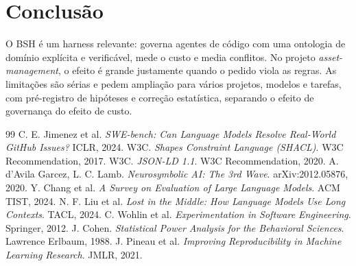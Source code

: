 \documentclass[11pt,a4paper]{article}
\begin{document}
\section{Conclusão}
O BSH é um harness relevante: governa agentes de código com uma ontologia de domínio explícita e verificável, mede o custo e media conflitos. No projeto \emph{asset-management}, o efeito é grande justamente quando o pedido viola as regras. As limitações são sérias e pedem ampliação para vários projetos, modelos e tarefas, com pré-registro de hipóteses e correção estatística, separando o efeito de governança do efeito de custo.

\begin{thebibliography}{99}
 C. E. Jimenez et al. \emph{SWE-bench: Can Language Models Resolve Real-World GitHub Issues?} ICLR, 2024.
 W3C. \emph{Shapes Constraint Language (SHACL)}. W3C Recommendation, 2017.
 W3C. \emph{JSON-LD 1.1}. W3C Recommendation, 2020.
 A. d'Avila Garcez, L. C. Lamb. \emph{Neurosymbolic AI: The 3rd Wave}. arXiv:2012.05876, 2020.
 Y. Chang et al. \emph{A Survey on Evaluation of Large Language Models}. ACM TIST, 2024.
 N. F. Liu et al. \emph{Lost in the Middle: How Language Models Use Long Contexts}. TACL, 2024.
 C. Wohlin et al. \emph{Experimentation in Software Engineering}. Springer, 2012.
 J. Cohen. \emph{Statistical Power Analysis for the Behavioral Sciences}. Lawrence Erlbaum, 1988.
 J. Pineau et al. \emph{Improving Reproducibility in Machine Learning Research}. JMLR, 2021.
\end{thebibliography}
\end{document}
